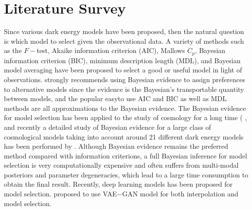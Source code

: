 \section{Literature Survey}
Since various dark energy models have been proposed, then the natural question is which model to select given the observational data. A variety of methods such as the $F-$test, Akaike information criterion (AIC), Mallows $C_{p}$, Bayesian information criterion (BIC), minimum description length (MDL), and Bayesian model averaging have been proposed to select a good or useful model in light of observations. \cite{mackay1992evidence} strongly recommends using Bayesian evidence to assign preferences to alternative models since the evidence is the Bayesian's transportable quantity between models, and the popular easyto use AIC and BIC as well as MDL methods are all approximations to the Bayesian evidence\cite{penny2006bayesian}. The Bayesian evidence for model selection has been applied to the study of cosmology for a long time (\cite{trotta2008bayes} \cite{martin2011hunting} \cite{basilakos2018dark}, and recently a detailed study of Bayesian evidence for a large class of cosmological models taking into account around 21 different dark energy models has been performed by \cite{lonappan2018bayesian}. Although Bayesian evidence remains the preferred method compared with information criterions, a full Bayesian inference for model selection is very computationally expensive and often suffers from multi-modal posteriors and parameter degeneracies, which lead to a large time consumption to obtain the final result. Recently, deep learning models has been proposed for model selection. \cite{li2019model} proposed to use VAE$-$GAN model for both interpolation and model selection.